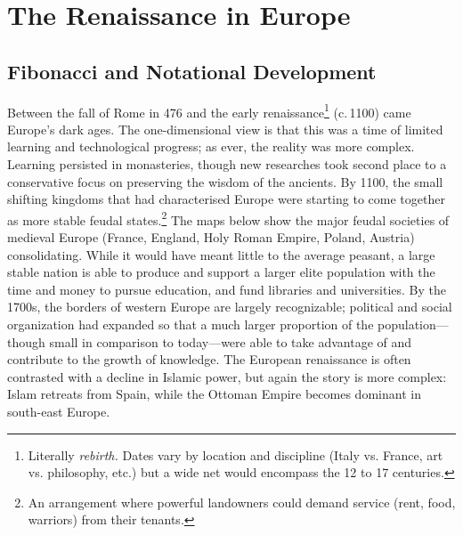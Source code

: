 \graphicspath{{7ren/pics/}}

\section{The Renaissance in Europe}

\subsection{Fibonacci and Notational Development}

Between the fall of Rome in 476 and the early renaissance\footnote{Literally \emph{rebirth.} Dates vary by location and discipline (Italy vs.{} France, art vs.{} philosophy, etc.) but a wide net would encompass the 12\th{} to 17\th{} centuries.} (c.\,1100) came Europe's dark ages. The one-dimensional view is that this was a time of limited learning and technological progress; as ever, the reality was more complex. Learning persisted in monasteries, though new researches took second place to a conservative focus on preserving the wisdom of the ancients.\smallbreak
By 1100, the small shifting kingdoms that had characterised Europe were starting to come together as more stable feudal states.\footnote{An arrangement where powerful landowners could demand service (rent, food, warriors) from their tenants.} The maps below show the major feudal societies of medieval Europe (France, England, Holy Roman Empire, Poland, Austria) consolidating. While it would have meant little to the average peasant, a large stable nation is able to produce and support a larger elite population with the time and money to pursue education, and fund libraries and universities. By the 1700s, the borders of western Europe are largely recognizable; political and social organization had expanded so that a much larger proportion of the population---though small in comparison to today---were able to take advantage of and contribute to the growth of knowledge. The European renaissance is often contrasted with a decline in Islamic power, but again the story is more complex: Islam retreats from Spain, while the Ottoman Empire becomes dominant in south-east Europe.

